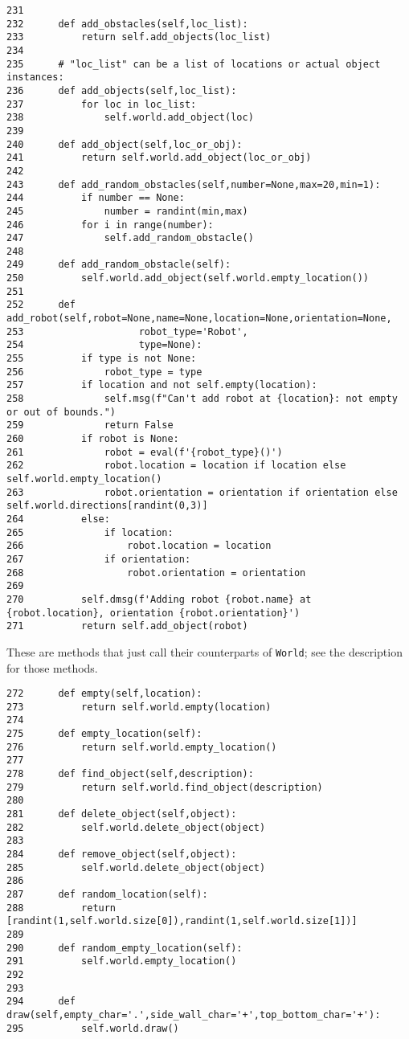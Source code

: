 \documentclass[11pt]{tufte-handout}
\begin{document}
\begin{verbatim}
231  
232      def add_obstacles(self,loc_list):
233          return self.add_objects(loc_list)
234  
235      # "loc_list" can be a list of locations or actual object instances:
236      def add_objects(self,loc_list):
237          for loc in loc_list:
238              self.world.add_object(loc)
239  
240      def add_object(self,loc_or_obj):
241          return self.world.add_object(loc_or_obj)
242  
243      def add_random_obstacles(self,number=None,max=20,min=1):
244          if number == None:
245              number = randint(min,max)
246          for i in range(number):
247              self.add_random_obstacle()
248  
249      def add_random_obstacle(self):
250          self.world.add_object(self.world.empty_location())
251  
252      def add_robot(self,robot=None,name=None,location=None,orientation=None,
253                    robot_type='Robot',
254                    type=None):
255          if type is not None:
256              robot_type = type
257          if location and not self.empty(location):
258              self.msg(f"Can't add robot at {location}: not empty or out of bounds.")
259              return False
260          if robot is None:
261              robot = eval(f'{robot_type}()')
262              robot.location = location if location else self.world.empty_location()
263              robot.orientation = orientation if orientation else self.world.directions[randint(0,3)]
264          else:
265              if location:
266                  robot.location = location
267              if orientation:
268                  robot.orientation = orientation
269  
270          self.dmsg(f'Adding robot {robot.name} at {robot.location}, orientation {robot.orientation}')
271          return self.add_object(robot)
\end{verbatim}

These are methods that just call their counterparts of \texttt{World}; see the description for those methods.

\begin{verbatim}
272      def empty(self,location):
273          return self.world.empty(location)
274  
275      def empty_location(self):
276          return self.world.empty_location()
277  
278      def find_object(self,description):
279          return self.world.find_object(description)
280  
281      def delete_object(self,object):
282          self.world.delete_object(object)
283  
284      def remove_object(self,object):
285          self.world.delete_object(object)
286  
287      def random_location(self):
288          return [randint(1,self.world.size[0]),randint(1,self.world.size[1])]
289  
290      def random_empty_location(self):
291          self.world.empty_location()
292  
293  
294      def draw(self,empty_char='.',side_wall_char='+',top_bottom_char='+'):
295          self.world.draw()
\end{verbatim}
\end{document}
